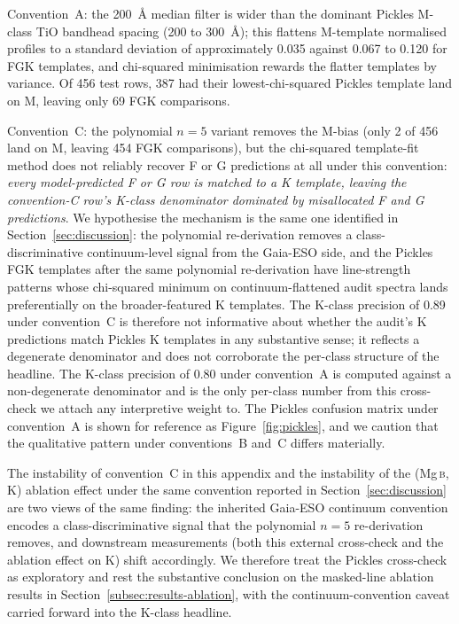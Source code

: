 \documentclass[11pt,a4paper]{article}
\newcommand{\Mgb}{Mg\,\textsc{b}\xspace}
\begin{document}
Convention~A: the 200~\AA{} median filter is wider than the dominant Pickles M-class TiO bandhead spacing (200 to 300~\AA{}); this flattens M-template normalised profiles to a standard deviation of approximately 0.035 against 0.067 to 0.120 for FGK templates, and chi-squared minimisation rewards the flatter templates by variance. Of 456 test rows, 387 had their lowest-chi-squared Pickles template land on M, leaving only 69 FGK comparisons.

Convention~C: the polynomial $n=5$ variant removes the M-bias (only 2 of 456 land on M, leaving 454 FGK comparisons), but the chi-squared template-fit method does not reliably recover F or G predictions at all under this convention: \emph{every model-predicted F or G row is matched to a K template, leaving the convention-C row's K-class denominator dominated by misallocated F and G predictions}. We hypothesise the mechanism is the same one identified in Section~\ref{sec:discussion}: the polynomial re-derivation removes a class-discriminative continuum-level signal from the Gaia-ESO side, and the Pickles FGK templates after the same polynomial re-derivation have line-strength patterns whose chi-squared minimum on continuum-flattened audit spectra lands preferentially on the broader-featured K templates. The K-class precision of 0.89 under convention~C is therefore not informative about whether the audit's K predictions match Pickles K templates in any substantive sense; it reflects a degenerate denominator and does not corroborate the per-class structure of the headline. The K-class precision of 0.80 under convention~A is computed against a non-degenerate denominator and is the only per-class number from this cross-check we attach any interpretive weight to. The Pickles confusion matrix under convention~A is shown for reference as Figure~\ref{fig:pickles}, and we caution that the qualitative pattern under conventions~B and~C differs materially.

The instability of convention~C in this appendix and the instability of the (\Mgb, K) ablation effect under the same convention reported in Section~\ref{sec:discussion} are two views of the same finding: the inherited Gaia-ESO continuum convention encodes a class-discriminative signal that the polynomial $n=5$ re-derivation removes, and downstream measurements (both this external cross-check and the ablation effect on K) shift accordingly. We therefore treat the Pickles cross-check as exploratory and rest the substantive conclusion on the masked-line ablation results in Section~\ref{subsec:results-ablation}, with the continuum-convention caveat carried forward into the K-class headline.
\end{document}
